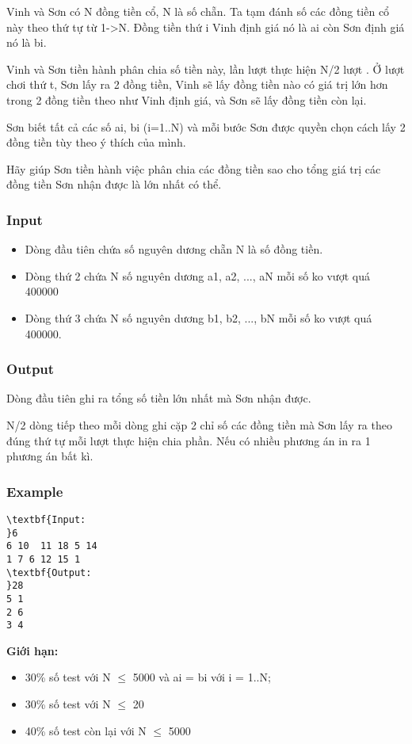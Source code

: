 

Vinh và Sơn có N đồng tiền cổ, N là số chẵn. Ta tạm đánh số các đồng tiền cổ này theo thứ tự từ 1->N. Đồng tiền thứ i Vinh định giá nó là ai còn Sơn định giá nó là bi.

Vinh và Sơn tiền hành phân chia số tiền này, lần lượt thực hiện N/2 lượt . Ở lượt chơi thứ t, Sơn lấy ra 2 đồng tiền, Vinh sẽ lấy đồng tiền nào có giá trị lớn hơn trong 2 đồng tiền theo như Vinh định giá, và Sơn sẽ lấy đồng tiền còn lại.

Sơn biết tất cả các số ai, bi (i=1..N) và mỗi bước Sơn được quyền chọn cách lấy 2 đồng tiền tùy theo ý thích của mình.

Hãy giúp Sơn tiền hành việc phân chia các đồng tiền sao cho tổng giá trị các đồng tiền Sơn nhận được là lớn nhất có thể.

\subsubsection{Input}
\begin{itemize}
	\item Dòng đầu tiên chứa số nguyên dương chẵn N là số đồng tiền.
	\item Dòng thứ 2 chứa N số nguyên dương a1, a2, ..., aN mỗi số ko vượt quá 400000
	\item Dòng thứ 3 chứa N số nguyên dương b1, b2, ..., bN mỗi số ko vượt quá 400000.
\end{itemize}

\subsubsection{Output}

Dòng đầu tiên ghi ra tổng số tiền lớn nhất mà Sơn nhận được.

N/2 dòng tiếp theo mỗi dòng ghi cặp 2 chỉ số các đồng tiền mà Sơn lấy ra theo đúng thứ tự mỗi lượt thực hiện chia phần. Nếu có nhiều phương án in ra 1 phương án bất kì.

\subsubsection{Example}
\begin{verbatim}
\textbf{Input:
}6
6 10  11 18 5 14
1 7 6 12 15 1
\textbf{Output:
}28
5 1
2 6
3 4
\end{verbatim}

\textbf{Giới hạn:}
\begin{itemize}
	\item 30\% số test với N  $\le$  5000 và ai = bi với i = 1..N;
	\item 30\% số test với N  $\le$  20
	\item 40\% số test còn lại với N  $\le$  5000 
\end{itemize}
